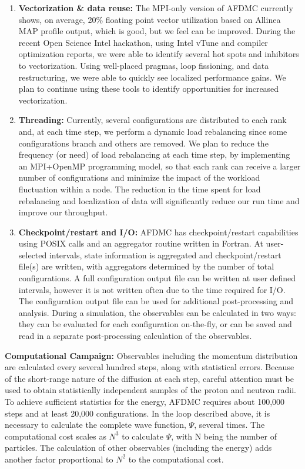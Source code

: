 \documentclass[12pt,letterpaper]{article}
\begin{document}
\begin{enumerate}
\item \textbf{Vectorization \& data reuse:} The MPI-only version of AFDMC 
currently shows, on average, 20\% floating point vector utilization based on 
Allinea MAP profile output, which is good, but we feel can be improved. 
During the recent Open Science Intel hackathon, using Intel vTune and 
compiler optimization reports, we were able to identify several hot spots 
and inhibitors to vectorization. Using well-placed pragmas, loop fissioning, 
and data restructuring, we were able to quickly see localized performance 
gains. We plan to continue using these tools to identify opportunities for 
increased vectorization.

\item \textbf{Threading:}
Currently, several configurations are distributed to each rank and, at each 
time step, we perform a dynamic load rebalancing since some configurations 
branch and others are removed. We plan to reduce the frequency (or need) of 
load rebalancing at each time step, by implementing an MPI+OpenMP 
programming model, so that each rank can receive a larger number of 
configurations and minimize the impact of the workload fluctuation within a 
node. The reduction in the time spent for load rebalancing and localization 
of data will significantly reduce our run time and improve our throughput.

\item \textbf{Checkpoint/restart and I/O:}
AFDMC has checkpoint/restart capabilities using POSIX calls and an 
aggregator routine written in Fortran. At user-selected intervals, state 
information is aggregated and checkpoint/restart file(s) are written, with 
aggregators determined by the number of total configurations. A full 
configuration output file can be written at user defined intervals, however it
is not written often due to the time required for I/O. The configuration 
output file can be used for additional post-processing and analysis. During 
a simulation, the observables can be calculated in two ways: they can be 
evaluated for each configuration on-the-fly, or can be saved and read in a 
separate post-processing calculation of the observables.
\end{enumerate}

\textbf{Computational Campaign:} Observables including the momentum 
distribution are calculated every several hundred steps, along with 
statistical errors. Because of the short-range nature of the diffusion at 
each step, careful attention must be used to obtain statistically 
independent samples of the proton and neutron radii. To achieve sufficient 
statistics for the energy, AFDMC requires about 100,000 steps and at least 
20,000 configurations. In the loop described above, it is necessary to 
calculate the complete wave function, $\Psi$, several times. The 
computational cost scales as $N^3$ to calculate $\Psi$, with N being the 
number of particles. The calculation of other observables (including the 
energy) adds another factor proportional to $N^2$ to the computational cost.

\newpage


\end{document}
